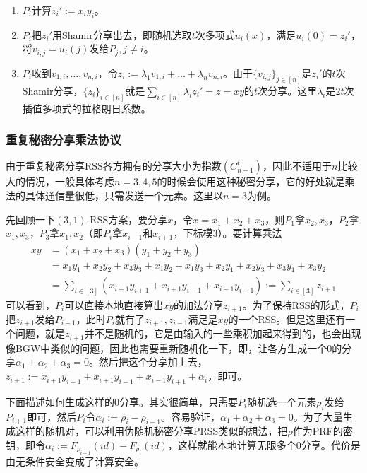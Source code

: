 \documentclass[UTF8]{ctexart}
\theoremstyle{nonumberplain}
\theoremstyle{plain}
\begin{document}
\begin{enumerate}
\item $P_i$计算$z_i':=x_iy_i$。
\item $P_i$把$z_i'$用Shamir分享出去，即随机选取$t$次多项式$u_i(x)$，满足$u_i(0)=z_i'$，将$v_{i,j}=u_i(j)$发给$P_j,j\ne i$。
\item $P_i$收到$v_{1,i},\dots,v_{n,i}$，令$z_i:=\lambda_1 v_{1,i}+\dots +\lambda_nv_{n,i}$。由于$\{v_{i,j}\}_{j\in [n]}$是$z_{i}'$的$t$次Shamir分享，$\{z_i\}_{i\in [n]}$就是$\sum_{i\in [n]}\lambda_i z_i'=z=xy$的$t$次分享。这里$\lambda_i$是$2t$次插值多项式的拉格朗日系数。
\end{enumerate}
\subsubsection{重复秘密分享乘法协议}
由于重复秘密分享RSS各方拥有的分享大小为指数$(C_{n-1}^t)$，因此不适用于$n$比较大的情况，一般具体考虑$n=3,4,5$的时候会使用这种秘密分享\cite{DBLP:conf/ccs/ArakiFLNO16,DBLP:conf/ccs/BoyleGIN19}，它的好处就是乘法的具体通信量很低，只需发送一个元素。这里以$n=3$为例。

先回顾一下$(3,1)$-RSS方案，要分享$x$，令$x=x_1+x_2+x_3$，则$P_1$拿$x_2,x_3$，$P_2$拿$x_1,x_3$，$P_3$拿$x_1,x_2$（即$P_i$拿$x_{i-1}$和$x_{i+1}$，下标模3）。要计算乘法
\begin{align*}
xy&=(x_1+x_2+x_3)(y_1+y_2+y_3)\\
&=x_1y_1+x_2y_2+x_3y_3+x_1y_2+x_1y_3+x_2y_1+x_2y_3+x_3y_1+x_3y_2\\
&=\sum_{i\in [3]}(x_{i+1}y_{i+1}+x_{i+1}y_{i-1}+x_{i-1}y_{i+1}):=\sum_{i\in [3]}z_{i+1}
\end{align*}
可以看到，$P_i$可以直接本地直接算出$xy$的加法分享$z_{i+1}$。为了保持RSS的形式，$P_i$把$z_{i+1}$发给$P_{i-1}$，此时$P_i$就有了$z_{i+1},z_{i-1}$满足是$xy$的一个RSS。但是这里还有一个问题，就是$z_{i+1}$并不是随机的，它是由输入的一些乘积加起来得到的，也会出现像BGW中类似的问题，因此也需要重新随机化一下，即，让各方生成一个$0$的分享$\alpha_1+\alpha_2+\alpha_3=0$。然后把这个分享加上去，$z_{i+1}:=x_{i+1}y_{i+1}+x_{i+1}y_{i-1}+x_{i-1}y_{i+1}+\alpha_i$，即可。

下面描述如何生成这样的0分享。其实很简单，只需要$P_i$随机选一个元素$\rho_i$发给$P_{i+1}$即可，然后$P_i$令$\alpha_i:=\rho_i-\rho_{i-1}$。容易验证，$\alpha_1+\alpha_2+\alpha_3=0$。为了大量生成这样的随机对，可以利用伪随机秘密分享PRSS类似的想法，把$\rho$作为PRF的密钥，即令$\alpha_i:=F_{\rho_{i-1}}(id)-F_{\rho_i}(id)$，这样就能本地计算无限多个0分享。代价是由无条件安全变成了计算安全。
\end{document}
